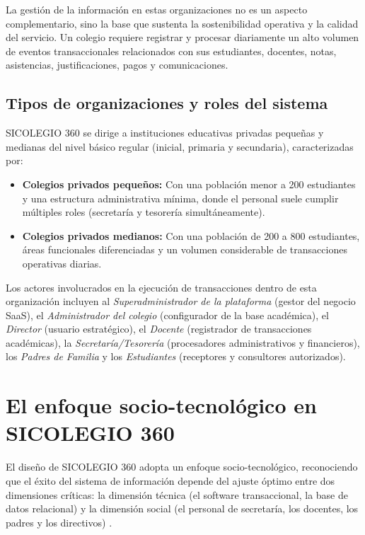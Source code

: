 \documentclass[12pt,a4paper,oneside]{report}
\begin{document}
La gestión de la información en estas organizaciones no es un aspecto complementario, sino la base que sustenta la sostenibilidad operativa y la calidad del servicio. Un colegio requiere registrar y procesar diariamente un alto volumen de eventos transaccionales relacionados con sus estudiantes, docentes, notas, asistencias, justificaciones, pagos y comunicaciones.

\subsection{Tipos de organizaciones y roles del sistema}
SICOLEGIO 360 se dirige a instituciones educativas privadas pequeñas y medianas del nivel básico regular (inicial, primaria y secundaria), caracterizadas por:
\begin{itemize}
    \item \textbf{Colegios privados pequeños:} Con una población menor a 200 estudiantes y una estructura administrativa mínima, donde el personal suele cumplir múltiples roles (secretaría y tesorería simultáneamente).
    \item \textbf{Colegios privados medianos:} Con una población de 200 a 800 estudiantes, áreas funcionales diferenciadas y un volumen considerable de transacciones operativas diarias.
\end{itemize}
Los actores involucrados en la ejecución de transacciones dentro de esta organización incluyen al \textit{Superadministrador de la plataforma} (gestor del negocio SaaS), el \textit{Administrador del colegio} (configurador de la base académica), el \textit{Director} (usuario estratégico), el \textit{Docente} (registrador de transacciones académicas), la \textit{Secretaría/Tesorería} (procesadores administrativos y financieros), los \textit{Padres de Familia} y los \textit{Estudiantes} (receptores y consultores autorizados).

\section{El enfoque socio-tecnológico en SICOLEGIO 360}

El diseño de SICOLEGIO 360 adopta un enfoque socio-tecnológico, reconociendo que el éxito del sistema de información depende del ajuste óptimo entre dos dimensiones críticas: la dimensión técnica (el software transaccional, la base de datos relacional) y la dimensión social (el personal de secretaría, los docentes, los padres y los directivos) \citep{laudon2016}.
\end{document}
